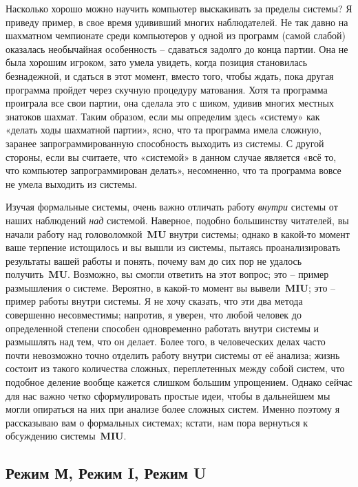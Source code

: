 \documentclass[../main.tex]{subfiles}
\begin{document}
Насколько хорошо можно научить компьютер выскакивать за пределы системы? Я приведу пример, в свое время удививший многих наблюдателей. Не так давно на шахматном чемпионате среди компьютеров у одной из программ (самой слабой) оказалась необычайная особенность \--- сдаваться задолго до конца партии. Она не была хорошим игроком, зато умела увидеть, когда позиция становилась безнадежной, и сдаться в этот момент, вместо того, чтобы ждать, пока другая программа пройдет через скучную процедуру матования. Хотя та программа проиграла все свои партии, она сделала это с шиком, удивив многих местных знатоков шахмат. Таким образом, если мы определим здесь «систему» как «делать ходы шахматной партии», ясно, что та программа имела сложную, заранее запрограммированную способность выходить из системы. С другой стороны, если вы считаете, что «системой» в данном случае является «всё то, что компьютер запрограммирован делать», несомненно, что та программа вовсе не умела выходить из системы.

Изучая формальные системы, очень важно отличать работу \emph{внутри} системы от наших наблюдений \emph{над} системой. Наверное, подобно большинству читателей, вы начали работу над головоломкой~\textbf{MU} внутри системы; однако в какой-то момент ваше терпение истощилось и вы вышли из системы, пытаясь проанализировать результаты вашей работы и понять, почему вам до сих пор не удалось получить~\textbf{MU}\@. Возможно, вы смогли ответить на этот вопрос; это \--- пример размышления о системе. Вероятно, в какой-то момент вы вывели~\textbf{MIU}; это \--- пример работы внутри системы. Я не хочу сказать, что эти два метода совершенно несовместимы; напротив, я уверен, что любой человек до определенной степени способен одновременно работать внутри системы и размышлять над тем, что он делает. Более того, в человеческих делах часто почти невозможно точно отделить работу внутри системы от её анализа; жизнь состоит из такого количества сложных, переплетенных между собой систем, что подобное деление вообще кажется слишком большим упрощением. Однако сейчас для нас важно четко сформулировать простые идеи, чтобы в дальнейшем мы могли опираться на них при анализе более сложных систем. Именно поэтому я рассказываю вам о формальных системах; кстати, нам пора вернуться к обсуждению системы~\textbf{MIU}.


\subsection{Режим М, Режим I, Режим U}
\end{document}
